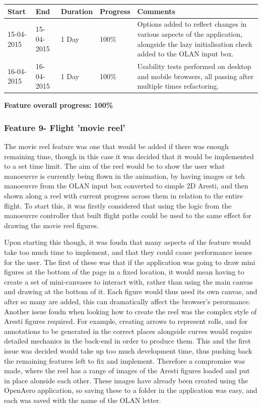 \begin{table}[h]
\begin{tabular}{|l|l|l|l|p{7cm}|}
\hline
\textbf{Start} & \textbf{End} & \textbf{Duration} & \textbf{Progress} & \textbf{Comments}                                                                                                     \\ \hline
15-04-2015     & 15-04-2015   & 1 Day            & 100\%             &  Options added to reflect changes in various aspects of the application, alongside the lazy initialisation check added to the OLAN input box.\\ \hline
16-04-2015     & 16-04-2015   & 1 Day            & 100\%             &  Usability tests performed on desktop and mobile browsers, all passing after multiple times refactoring. \\ \hline
\end{tabular}
\end{table}

\textbf{Feature overall progress: 100\%}

\subsubsection{Feature 9- Flight 'movie reel'}
The movie reel feature was one that would be added if there was enough remaining time, though in this case it was decided that it would be implemented to a set time limit. The aim of the reel would be to show the user what manoeuvre is currently being flown in the animation, by having images or teh manoeuvre from the OLAN input box converted to simple 2D Aresti, and then shown along a reel with current progress across them in relation to the entire flight. To start this, it was firstly considered that using the logic from the manoeuvre controller that built flight paths could be used to the same effect for drawing the movie reel figures. 

Upon starting this though, it was foudn that many aspects of the feature would take too much time to implement, and that they could cause performance issues for the user. The first of these was that if the application was going to draw mini figures at the bottom of the page in a fixed location, it would mean having to create a set of mini-canvases to interact with, rather than using the main canvas and drawing at the bottom of it. Each figure would thus need its own canvas, and after so many are added, this can dramatically affect the browser's perormance. Another issue foudn when looking how to create the reel was the complex style of Aresti figures required. For example, creating arrows to represent rolls, and for annotations to be generated in the correct places alongside curves would require detailed mechanics in the back-end in order to produce them. This and the first issue was decided would take up too much development time, thus pushing back the remaining features left to fix and implement. Therefore a compromise was made, where the reel has a range of images of the Aresti figures loaded and put in place alonside each other. These images have already been created using the OpenAero application, so saving these to a folder in the application was easy, and each was saved with the name of the OLAN letter. 

